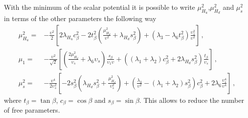 \documentclass[12pt]{article}
\begin{document}
With the minimum of the scalar potential it is possible to write $\mu_{H_{u}}^{2}$,$\mu_{H_{d}}^{2}$ and $\mu^{2}_{s}$ in terms of the other parameters the following way
%
\begin{align*}
    \mu^{2}_{H_{u}} =& -\frac{\upsilon^{2}}{2}\left[ 2 \lambda_{H_{u}} c^{2}_{\beta} - 2 t^{2}_{\beta} \left(\frac{\mu^{2}_{H_{d}}}{\upsilon^{2}}+\lambda_{H_{d}} s^{2}_{\beta} \right) + \left( \lambda_{3} - \lambda_{6} t^{2}_{\beta} \right) \frac{\upsilon^{2}_{s}}{\upsilon^{2}} \right]\,, \\
    \mu_{1} =& -\frac{\upsilon^{2}}{\sqrt{2}} \left[ \left( \frac{2\mu^{2}_{H_{d}}}{\upsilon_{s}} + \lambda_{6} \upsilon_{s} \right) \frac{s_{\beta}}{\upsilon_{1} \upsilon} + \left( (\lambda_{1}+\lambda_{2})c^{2}_{\beta} + 2 \lambda_{H_{d}} s^{2}_{\beta} \right) \frac{t_{\beta}}{\upsilon_{s}} \right]\,, \\
   \mu^{2}_{s} =& -\frac{\upsilon^{4}}{2 \upsilon^{2}_{s}} \left[ -2s^{2}_{\beta} \left( \lambda_{H_{d}} s^{2}_{\beta} + \frac{\mu^{2}_{H_{d}}}{\upsilon^{2}_{s}}\right) + \left( \frac{\lambda_{3}}{\upsilon^{2}} - (\lambda_{1}+\lambda_{2})s^{2}_{\beta} \right) c^{2}_{\beta} + 2 \lambda_{6} \frac{\upsilon^{4}_{s}}{\upsilon^{4}} \right]\,,
\end{align*}
%
where $t_{\beta} = \tan \beta$, $c_{\beta} = \cos \beta$ and $s_{\beta} = \sin \beta$. This allows to reduce the number of free parameters.
\end{document}
